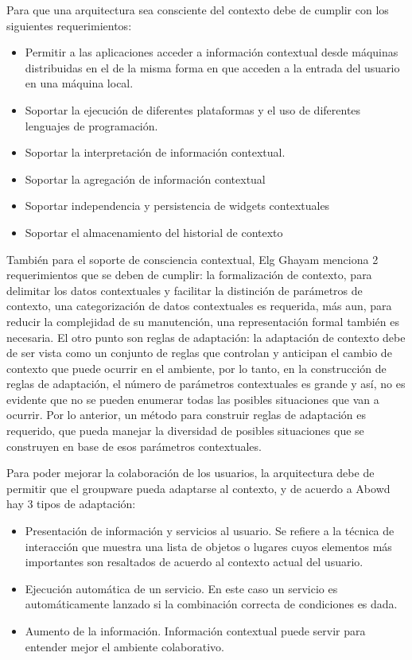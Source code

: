 Para que una arquitectura sea consciente del contexto debe de cumplir con los siguientes requerimientos\cite{dey1999architecture}:
\begin{itemize}
\item Permitir a las aplicaciones acceder a informaci\'on contextual desde m\'aquinas distribuidas en el de la misma forma en que acceden a la entrada del usuario en una m\'aquina local.
\item Soportar la ejecuci\'on de diferentes plataformas y el uso de diferentes lenguajes de programaci\'on.
\item Soportar la interpretaci\'on de informaci\'on contextual.
\item Soportar la agregaci\'on de informaci\'on contextual
\item Soportar independencia y persistencia de widgets contextuales
\item Soportar el almacenamiento del historial de contexto
\end{itemize}

Tambi\'en para el soporte de consciencia contextual, Elg Ghayam \cite{el2011distributed} menciona 2 requerimientos que se deben de cumplir: la formalizaci\'on de contexto, para delimitar los datos contextuales y facilitar la distinci\'on de par\'ametros de contexto, una categorizaci\'on de datos contextuales es requerida, m\'as aun, para reducir la complejidad de su manutenci\'on, una representaci\'on formal tambi\'en es necesaria. El otro punto son reglas de adaptaci\'on: la adaptaci\'on de contexto debe de ser vista como un conjunto de reglas que controlan y anticipan el cambio de contexto que puede ocurrir en el ambiente, por lo tanto, en la construcci\'on de reglas de adaptaci\'on, el n\'umero de par\'ametros contextuales es grande y as\'i, no es evidente que no se pueden enumerar todas las posibles situaciones que van a ocurrir. Por lo anterior, un m\'etodo para construir reglas de adaptaci\'on es requerido, que pueda manejar la diversidad de posibles situaciones que se construyen en base de esos par\'ametros contextuales.

Para poder mejorar la colaboraci\'on de los usuarios, la arquitectura debe de permitir que el groupware pueda adaptarse al contexto, y de acuerdo a Abowd\cite{abowd1999towards} hay 3 tipos de adaptaci\'on:
\begin{itemize}
\item  Presentaci\'on de informaci\'on y servicios al usuario. Se refiere a la t\'ecnica de interacci\'on que muestra una lista de objetos o lugares cuyos elementos m\'as importantes son resaltados de acuerdo al contexto actual del usuario.
\item Ejecuci\'on autom\'atica de un servicio. En este caso un servicio es autom\'aticamente lanzado si la combinaci\'on correcta de condiciones es dada.
\item Aumento de la informaci\'on. Informaci\'on contextual puede servir para entender mejor el ambiente colaborativo.
\end{itemize}

